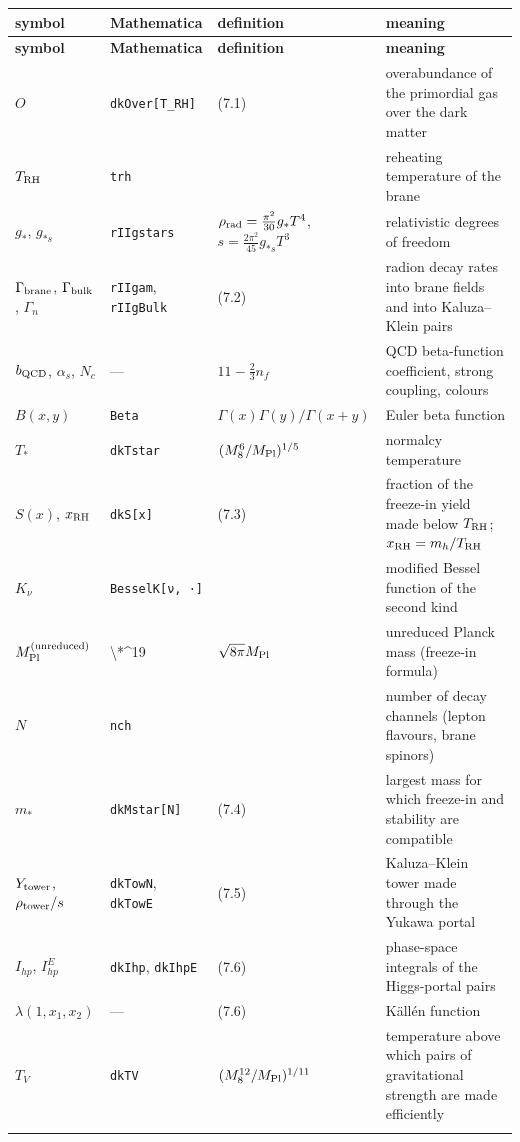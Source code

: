 \documentclass[10pt,a4paper]{article}
\begin{document}
{\small
\begin{longtable}{>{\raggedright\arraybackslash}p{}>{\raggedright\arraybackslash}p{}>{\raggedright\arraybackslash}p{}>{\raggedright\arraybackslash}p{}}
\toprule
\textbf{symbol} & \textbf{Mathematica} & \textbf{definition} & \textbf{meaning} \\
\midrule\endfirsthead
\toprule
\textbf{symbol} & \textbf{Mathematica} & \textbf{definition} & \textbf{meaning} \\
\midrule\endhead
\endfoot
\bottomrule\endlastfoot
$O$ & \texttt{dkOver[T\_\allowbreak{}RH]} & (7.1) & overabundance of the primordial gas over the dark matter \\
$T_{\rm RH}$ & \texttt{trh} &  & reheating temperature of the brane \\
$g_*$, $g_{*s}$ & \texttt{rIIgstars} & $\rho_{\rm rad}=\frac{\pi^2}{30}g_*T^4$, $s=\frac{2\pi^2}{45}g_{*s}T^3$ & relativistic degrees of freedom \\
$\Gamma_{\rm brane}$, $\Gamma_{\rm bulk}$, $\Gamma_n$ & \texttt{rIIgam}, \texttt{rIIgBulk} & (7.2) & radion decay rates into brane fields and into Kaluza–Klein pairs \\
$b_{\rm QCD}$, $\alpha_s$, $N_c$ & — & $11-\frac23n_f$ & QCD beta-function coefficient, strong coupling, colours \\
$B(x,y)$ & \texttt{Beta} & $\Gamma(x)\Gamma(y)/\Gamma(x+y)$ & Euler beta function \\
$T_*$ & \texttt{dkTstar} & $(M_8^6/M_{\rm Pl})^{1/5}$ & normalcy temperature \\
$S(x)$, $x_{\rm RH}$ & \texttt{dkS[x]} & (7.3) & fraction of the freeze-in yield made below $T_{\rm RH}$; $x_{\rm RH}=m_h/T_{\rm RH}$ \\
$K_\nu$ & \texttt{BesselK[ν, ·]} &  & modified Bessel function of the second kind \\
$M_{\rm Pl}^{\rm (unreduced)}$ & 1.22091\textbackslash{}*\textasciicircum{}19 & $\sqrt{8\pi}M_{\rm Pl}$ & unreduced Planck mass (freeze-in formula) \\
$N$ & \texttt{nch} &  & number of decay channels (lepton flavours, brane spinors) \\
$m_*$ & \texttt{dkMstar[N]} & (7.4) & largest mass for which freeze-in and stability are compatible \\
$Y_{\rm tower}$, $\rho_{\rm tower}/s$ & \texttt{dkTowN}, \texttt{dkTowE} & (7.5) & Kaluza–Klein tower made through the Yukawa portal \\
$I_{hp}$, $I_{hp}^E$ & \texttt{dkIhp}, \texttt{dkIhpE} & (7.6) & phase-space integrals of the Higgs-portal pairs \\
$\lambda(1,x_1,x_2)$ & — & (7.6) & Källén function \\
$T_V$ & \texttt{dkTV} & $(M_8^{12}/M_{\rm Pl})^{1/11}$ & temperature above which pairs of gravitational strength are made efficiently \\*
\end{longtable}}
\end{document}
